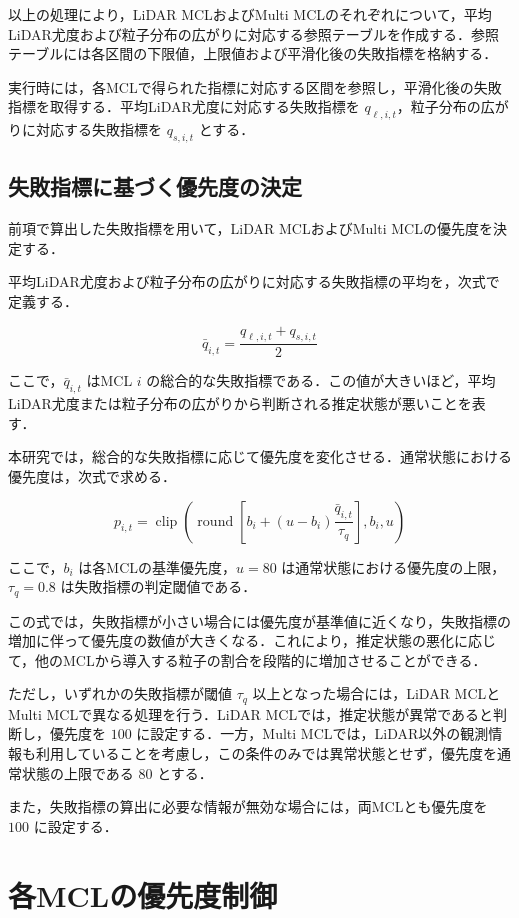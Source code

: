 以上の処理により，LiDAR MCLおよびMulti MCLのそれぞれについて，平均LiDAR尤度および粒子分布の広がりに対応する参照テーブルを作成する．参照テーブルには各区間の下限値，上限値および平滑化後の失敗指標を格納する．

実行時には，各MCLで得られた指標に対応する区間を参照し，平滑化後の失敗指標を取得する．平均LiDAR尤度に対応する失敗指標を $q_{\ell,i,t}$，粒子分布の広がりに対応する失敗指標を $q_{s,i,t}$ とする．

\subsection{失敗指標に基づく優先度の決定}

前項で算出した失敗指標を用いて，LiDAR MCLおよびMulti MCLの優先度を決定する．

平均LiDAR尤度および粒子分布の広がりに対応する失敗指標の平均を，次式で定義する．

\[
\bar{q}_{i,t}=
\frac{q_{\ell,i,t}+q_{s,i,t}}{2}
\]

ここで，$\bar{q}_{i,t}$ はMCL $i$ の総合的な失敗指標である．この値が大きいほど，平均LiDAR尤度または粒子分布の広がりから判断される推定状態が悪いことを表す．

本研究では，総合的な失敗指標に応じて優先度を変化させる．通常状態における優先度は，次式で求める．

\[
p_{i,t}=
\operatorname{clip}
\left(
\operatorname{round}
\left[
b_i+(u-b_i)
\frac{\bar{q}_{i,t}}{\tau_q}
\right],
b_i,u
\right)
\]

ここで，$b_i$ は各MCLの基準優先度，$u=80$ は通常状態における優先度の上限，$\tau_q=0.8$ は失敗指標の判定閾値である．

この式では，失敗指標が小さい場合には優先度が基準値に近くなり，失敗指標の増加に伴って優先度の数値が大きくなる．これにより，推定状態の悪化に応じて，他のMCLから導入する粒子の割合を段階的に増加させることができる．

ただし，いずれかの失敗指標が閾値 $\tau_q$ 以上となった場合には，LiDAR MCLとMulti MCLで異なる処理を行う．LiDAR MCLでは，推定状態が異常であると判断し，優先度を $100$ に設定する．一方，Multi MCLでは，LiDAR以外の観測情報も利用していることを考慮し，この条件のみでは異常状態とせず，優先度を通常状態の上限である $80$ とする．

また，失敗指標の算出に必要な情報が無効な場合には，両MCLとも優先度を $100$ に設定する．

\section{各MCLの優先度制御}


